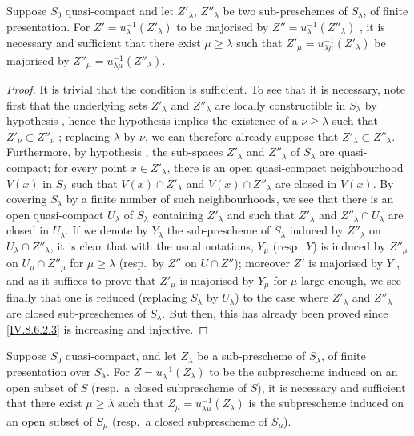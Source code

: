 \begin{corollary}[8.6.3.1]
\label{IV.8.6.3.1}
Suppose $S_0$ quasi-compact and let $Z'_\lambda$, $Z''_\lambda$ be two sub-preschemes of $S_\lambda$, of finite presentation.
For $Z'=u_\lambda^{-1}(Z'_\lambda)$ to be majorised by $Z''=u_\lambda^{-1}(Z''_\lambda)$ , it is necessary and sufficient that there exist $\mu\geqslant\lambda$ such that $Z'_\mu=u_{\lambda\mu}^{-1}(Z'_\lambda)$ be majorised by $Z''_\mu=u_{\lambda\mu}^{-1}(Z''_\lambda)$.
\end{corollary}

\begin{proof}
It is trivial that the condition is sufficient.
To see that it is necessary, note first that the underlying sets $Z'_\lambda$ and $Z''_\lambda$ are locally constructible in $S_\lambda$ by hypothesis , hence the hypothesis implies the existence of a $\nu\geqslant\lambda$ such that $Z'_\nu\subset Z''_\nu$ ; replacing $\lambda$ by $\nu$, we can therefore already suppose that $Z'_\lambda\subset Z''_\lambda$.
Furthermore, by hypothesis , the sub-spaces $Z'_\lambda$ and $Z''_\lambda$ of $S_\lambda$ are quasi-compact; for every point $x\in Z'_\lambda$, there is an open quasi-compact neighbourhood $V(x)$ in $S_\lambda$ such that $V(x)\cap Z'_\lambda$ and $V(x)\cap Z''_\lambda$ are closed in $V(x)$.
By covering $S_\lambda$ by a finite number of such neighbourhoods, we see that there is an open quasi-compact $U_\lambda$ of $S_\lambda$ containing $Z'_\lambda$ and such that $Z'_\lambda$ and $Z''_\lambda\cap U_\lambda$ are closed in $U_\lambda$.
If we denote by $Y_\lambda$ the sub-prescheme of $S_\lambda$ induced by $Z''_\lambda$ on $U_\lambda\cap Z''_\lambda$, it is clear that with the usual notations, $Y_\mu$ (resp.\ $Y$) is induced by $Z''_\mu$ on $U_\mu\cap Z''_\mu$ for $\mu\geqslant\lambda$ (resp.\ by $Z''$ on $U\cap Z''$); moreover $Z'$ is majorised by $Y$ , and as it suffices to prove that $Z'_\mu$ is majorised by $Y_\mu$ for $\mu$
large enough, we see finally that one is reduced (replacing $S_\lambda$ by $U_\lambda$) to the case where $Z'_\lambda$ and $Z''_\lambda$ are closed sub-preschemes of $S_\lambda$.
But then, this has already been proved since \eqref{IV.8.6.2.3} is increasing and injective.
\end{proof}

\begin{corollary}[8.6.4]
\label{IV.8.6.4}
Suppose $S_0$ quasi-compact, and let $Z_\lambda$ be a sub-prescheme of $S_\lambda$, of finite presentation over $S_\lambda$.
For $Z=u_\lambda^{-1}(Z_\lambda)$ to be the subprescheme induced on an open subset of $S$ (resp.\ a closed subprescheme of $S$), it is necessary and sufficient that there exist $\mu\geqslant\lambda$ such that $Z_\mu=u_{\lambda\mu}^{-1}(Z_\lambda)$ is the subprescheme induced on an open subset of $S_\mu$ (resp.\ a closed subprescheme of $S_\mu$).
\end{corollary}

